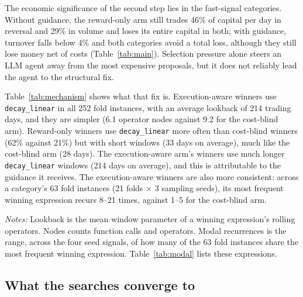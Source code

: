 \documentclass[preprint,12pt,authoryear]{elsarticle}
\newcommand{\tablenote}[1]{\par\vspace{0.4em}\begin{minipage}{\linewidth}\footnotesize #1\end{minipage}}
\begin{document}
The economic significance of the second step lies in the fast-signal categories. Without guidance, the reward-only arm still trades 46\% of capital per day in reversal and 29\% in volume and loses its entire capital in both; with guidance, turnover falls below 4\% and both categories avoid a total loss, although they still lose money net of costs (Table~\ref{tab:main}). Selection pressure alone steers an LLM agent away from the most expensive proposals, but it does not reliably lead the agent to the structural fix.

Table~\ref{tab:mechanism} shows what that fix is. Execution-aware winners use \texttt{decay\_linear} in all 252 fold instances, with an average lookback of 214 trading days, and they are simpler (6.1 operator nodes against 9.2 for the cost-blind arm). Reward-only winners use \texttt{decay\_linear} more often than cost-blind winners (62\% against 21\%) but with short windows (33 days on average), much like the cost-blind arm (28 days). The execution-aware arm's winners use much longer \texttt{decay\_linear} windows (214 days on average), and this is attributable to the guidance it receives. The execution-aware winners are also more consistent: across a category's 63 fold instances (21 folds $\times$ 3 sampling seeds), its most frequent winning expression recurs 8--21 times, against 1--5 for the cost-blind arm.

\begin{table}[t]
\centering
\caption{Structure of the winning factors (252 fold instances per arm).}
\label{tab:mechanism}
\footnotesize
{}
\tablenote{\emph{Notes:} Lookback is the mean window parameter of a winning expression's rolling operators. Nodes counts function calls and operators. Modal recurrences is the range, across the four seed signals, of how many of the 63 fold instances share the most frequent winning expression. Table~\ref{tab:modal} lists these expressions.}
\end{table}

\subsection{What the searches converge to}\label{sec:modal}
\end{document}
